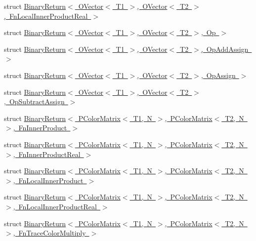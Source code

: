 \begin{DoxyCompactItemize}
\item 
struct \mbox{\hyperlink{structENSEM_1_1BinaryReturn_3_01OVector_3_01T1_01_4_00_01OVector_3_01T2_01_4_00_01FnLocalInnerProductReal_01_4}{Binary\+Return$<$ O\+Vector$<$ T1 $>$, O\+Vector$<$ T2 $>$, Fn\+Local\+Inner\+Product\+Real $>$}}
\item 
struct \mbox{\hyperlink{structENSEM_1_1BinaryReturn_3_01OVector_3_01T1_01_4_00_01OVector_3_01T2_01_4_00_01Op_01_4}{Binary\+Return$<$ O\+Vector$<$ T1 $>$, O\+Vector$<$ T2 $>$, Op $>$}}
\item 
struct \mbox{\hyperlink{structENSEM_1_1BinaryReturn_3_01OVector_3_01T1_01_4_00_01OVector_3_01T2_01_4_00_01OpAddAssign_01_4}{Binary\+Return$<$ O\+Vector$<$ T1 $>$, O\+Vector$<$ T2 $>$, Op\+Add\+Assign $>$}}
\item 
struct \mbox{\hyperlink{structENSEM_1_1BinaryReturn_3_01OVector_3_01T1_01_4_00_01OVector_3_01T2_01_4_00_01OpAssign_01_4}{Binary\+Return$<$ O\+Vector$<$ T1 $>$, O\+Vector$<$ T2 $>$, Op\+Assign $>$}}
\item 
struct \mbox{\hyperlink{structENSEM_1_1BinaryReturn_3_01OVector_3_01T1_01_4_00_01OVector_3_01T2_01_4_00_01OpSubtractAssign_01_4}{Binary\+Return$<$ O\+Vector$<$ T1 $>$, O\+Vector$<$ T2 $>$, Op\+Subtract\+Assign $>$}}
\item 
struct \mbox{\hyperlink{structENSEM_1_1BinaryReturn_3_01PColorMatrix_3_01T1_00_01N_01_4_00_01PColorMatrix_3_01T2_00_01N_01_4_00_01FnInnerProduct_01_4}{Binary\+Return$<$ P\+Color\+Matrix$<$ T1, N $>$, P\+Color\+Matrix$<$ T2, N $>$, Fn\+Inner\+Product $>$}}
\item 
struct \mbox{\hyperlink{structENSEM_1_1BinaryReturn_3_01PColorMatrix_3_01T1_00_01N_01_4_00_01PColorMatrix_3_01T2_00_01N_a4676c92a67ac76680eb238b39ddbac2}{Binary\+Return$<$ P\+Color\+Matrix$<$ T1, N $>$, P\+Color\+Matrix$<$ T2, N $>$, Fn\+Inner\+Product\+Real $>$}}
\item 
struct \mbox{\hyperlink{structENSEM_1_1BinaryReturn_3_01PColorMatrix_3_01T1_00_01N_01_4_00_01PColorMatrix_3_01T2_00_01N_8f6cd73d0788242d6be21a14b362f366}{Binary\+Return$<$ P\+Color\+Matrix$<$ T1, N $>$, P\+Color\+Matrix$<$ T2, N $>$, Fn\+Local\+Inner\+Product $>$}}
\item 
struct \mbox{\hyperlink{structENSEM_1_1BinaryReturn_3_01PColorMatrix_3_01T1_00_01N_01_4_00_01PColorMatrix_3_01T2_00_01N_e5866205f9ef728862be5918de5ab5d4}{Binary\+Return$<$ P\+Color\+Matrix$<$ T1, N $>$, P\+Color\+Matrix$<$ T2, N $>$, Fn\+Local\+Inner\+Product\+Real $>$}}
\item 
struct \mbox{\hyperlink{structENSEM_1_1BinaryReturn_3_01PColorMatrix_3_01T1_00_01N_01_4_00_01PColorMatrix_3_01T2_00_01N_a47a4c46ca38f78d2b12e618a0cca27a}{Binary\+Return$<$ P\+Color\+Matrix$<$ T1, N $>$, P\+Color\+Matrix$<$ T2, N $>$, Fn\+Trace\+Color\+Multiply $>$}}

\end{DoxyCompactItemize}
